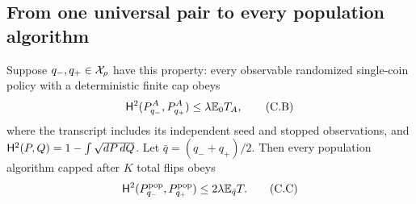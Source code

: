 \subsection{From one universal pair to every population algorithm}
\begin{lemma}\label{crit:lem:population-prefix}
Suppose $q_-,q_+\in\mathcal X_\rho$ have this property: every observable randomized
single-coin policy with a deterministic finite cap obeys
\[
 \mathsf H^2(P^A_{q_-},P^A_{q_+})\le\lambda\mathbb E_0 T_A,           \tag{C.B}
\]
where the transcript includes its independent seed and stopped observations,
and $\mathsf H^2(P,Q)=1-\int\sqrt{dP\,dQ}$. Let $\bar q=(q_-+q_+)/2$.
Then every population algorithm capped after $K$ total flips obeys
\[
 \mathsf H^2(P_{q_-}^{\rm pop},P_{q_+}^{\rm pop})
       \le2\lambda\mathbb E_{\bar q}T.                       \tag{C.C}
\]
\end{lemma}

